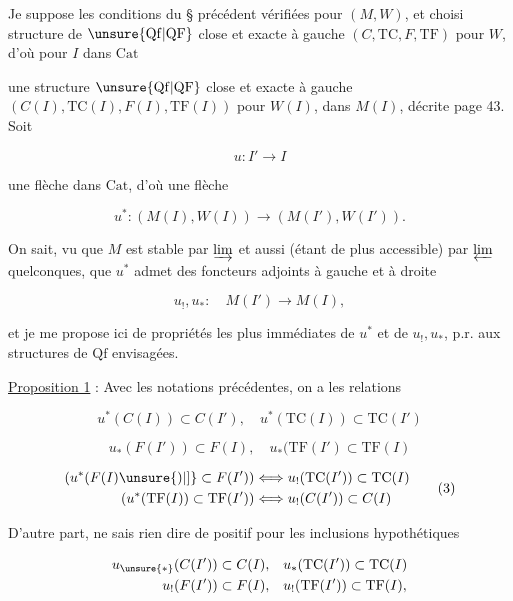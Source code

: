 Je suppose  les conditions du § précédent vérifiées pour $(M,W)$, et choisi  structure de $\unsure{\mathrm{Qf}|\mathrm{QF}}$ close et exacte à gauche $(C,\mathrm{TC},F,\mathrm{TF})$ pour $W$, d'où pour  $I$ dans $\mathrm{Cat}$

une structure $\unsure{\mathrm{Qf}|\mathrm{QF}}$ close et exacte à gauche $(C(I),\mathrm{TC}(I),F(I),\mathrm{TF}(I))$ pour $W(I)$, dans $M(I)$, décrite page 43. Soit  

\[ u:I'\longrightarrow I \]

une flèche dans $\mathrm{Cat}$, d'où une flèche

\[ u^*:(M(I),W(I))\longrightarrow(M(I'),W(I')). \]

On sait, vu que $M$ est stable par $\varinjlim$  et aussi (étant de plus accessible) par $\varprojlim$ quelconques, que $u^*$ admet des foncteurs adjoints à gauche et à droite

\[ u_!,u_*:\quad M(I')\longrightarrow M(I), \]

et je me propose ici de   propriétés les plus immédiates de $u^*$ et de $u_!,u_*$, p.r. aux structures de $\mathrm{Qf}$ envisagées.

\uline{Proposition 1} : Avec les notations précédentes, on a les relations

\[ u^*(C(I))\subset C(I'),\quad u^*(\mathrm{TC}(I))\subset\mathrm{TC}(I') \tag*{(1)} \]

\[ u_*(F(I'))\subset F(I),\quad u_*(\mathrm{TF}(I')\subset\mathrm{TF}(I) \tag*{(2)} \]

\[ \begin{aligned}
(u^*(F(I)\unsure{)|]}\subset F(I'))&\Longleftrightarrow u_!(\mathrm{TC}(I'))\subset\mathrm{TC}(I)\\
(u^*(\mathrm{TF}(I))\subset\mathrm{TF}(I'))&\Longleftrightarrow u_!(C(I'))\subset C(I)
\end{aligned} \tag*{(3)} \]

D'autre part,  ne  sais rien dire de positif pour les inclusions hypothétiques

\[ \begin{aligned}
u_{\unsure{*}}(C(I'))\subset C(I),&\quad u_*(\mathrm{TC}(I'))\subset\mathrm{TC}(I)\\
u_!(F(I'))\subset F(I),&\quad u_!(\mathrm{TF}(I'))\subset\mathrm{TF}(I),
\end{aligned} \]

